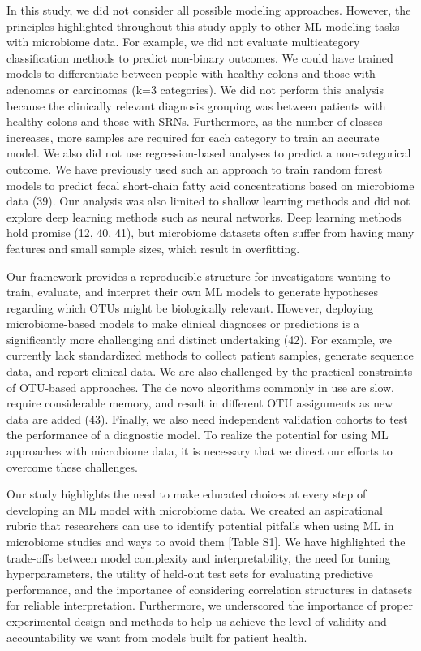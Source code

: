 \documentclass[
  11pt,
]{article}
\begin{document}
In this study, we did not consider all possible modeling approaches.
However, the principles highlighted throughout this study apply to other
ML modeling tasks with microbiome data. For example, we did not evaluate
multicategory classification methods to predict non-binary outcomes. We
could have trained models to differentiate between people with healthy
colons and those with adenomas or carcinomas (k=3 categories). We did
not perform this analysis because the clinically relevant diagnosis
grouping was between patients with healthy colons and those with SRNs.
Furthermore, as the number of classes increases, more samples are
required for each category to train an accurate model. We also did not
use regression-based analyses to predict a non-categorical outcome. We
have previously used such an approach to train random forest models to
predict fecal short-chain fatty acid concentrations based on microbiome
data (39). Our analysis was also limited to shallow learning methods and
did not explore deep learning methods such as neural networks. Deep
learning methods hold promise (12, 40, 41), but microbiome datasets
often suffer from having many features and small sample sizes, which
result in overfitting.

Our framework provides a reproducible structure for investigators
wanting to train, evaluate, and interpret their own ML models to
generate hypotheses regarding which OTUs might be biologically relevant.
However, deploying microbiome-based models to make clinical diagnoses or
predictions is a significantly more challenging and distinct undertaking
(42). For example, we currently lack standardized methods to collect
patient samples, generate sequence data, and report clinical data. We
are also challenged by the practical constraints of OTU-based
approaches. The de novo algorithms commonly in use are slow, require
considerable memory, and result in different OTU assignments as new data
are added (43). Finally, we also need independent validation cohorts to
test the performance of a diagnostic model. To realize the potential for
using ML approaches with microbiome data, it is necessary that we direct
our efforts to overcome these challenges.

Our study highlights the need to make educated choices at every step of
developing an ML model with microbiome data. We created an aspirational
rubric that researchers can use to identify potential pitfalls when
using ML in microbiome studies and ways to avoid them {[}Table S1{]}. We
have highlighted the trade-offs between model complexity and
interpretability, the need for tuning hyperparameters, the utility of
held-out test sets for evaluating predictive performance, and the
importance of considering correlation structures in datasets for
reliable interpretation. Furthermore, we underscored the importance of
proper experimental design and methods to help us achieve the level of
validity and accountability we want from models built for patient
health.
\end{document}
